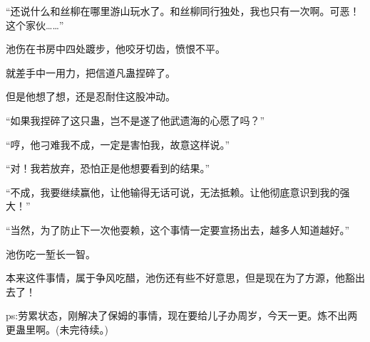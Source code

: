 \begin{this_body}
“还说什么和丝柳在哪里游山玩水了。和丝柳同行独处，我也只有一次啊。可恶！这个家伙……”

池伤在书房中四处踱步，他咬牙切齿，愤恨不平。

就差手中一用力，把信道凡蛊捏碎了。

但是他想了想，还是忍耐住这股冲动。

“如果我捏碎了这只蛊，岂不是遂了他武遗海的心愿了吗？”

“哼，他刁难我不成，一定是害怕我，故意这样说。”

“对！我若放弃，恐怕正是他想要看到的结果。”

“不成，我要继续赢他，让他输得无话可说，无法抵赖。让他彻底意识到我的强大！”

“当然，为了防止下一次他耍赖，这个事情一定要宣扬出去，越多人知道越好。”

池伤吃一堑长一智。

本来这件事情，属于争风吃醋，池伤还有些不好意思，但是现在为了方源，他豁出去了！

ps:劳累状态，刚解决了保姆的事情，现在要给儿子办周岁，今天一更。炼不出两更蛊里啊。(未完待续。)

\end{this_body}

